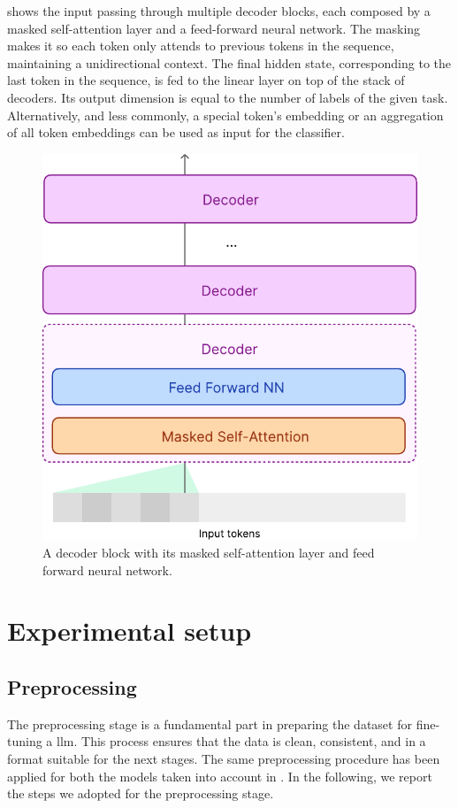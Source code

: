 \documentclass[11pt]{article}
\begin{document}
 shows the input passing through multiple decoder blocks, each composed by a masked 
self-attention layer and a feed-forward neural network. The masking makes it so each token only attends to previous tokens in the sequence, maintaining a unidirectional context. The final hidden state, corresponding to the last
token in the sequence, is fed to the linear layer on top of the stack of decoders. Its output dimension is equal to 
the number of labels of the given task.
%
Alternatively, and less commonly, a special token's embedding or an aggregation of all token embeddings can be
used as input for the classifier.

\begin{figure}
  \centering
  \includegraphics[width=0.8\linewidth]{figures/decoder-block.pdf}
  \caption{
    A decoder block with its masked self-attention layer and feed forward neural network.
  }
  \label{fig:decoder-block}
\end{figure}

\section{Experimental setup}\label{sec:experimental-setup}

\subsection{Preprocessing}\label{sec:preprocessing}
The preprocessing stage is a fundamental part in preparing the dataset for fine-tuning a \ac{llm}.
%
This process ensures that the data is clean, consistent, and in a format suitable for the next stages.
%
The same preprocessing procedure has been applied for both the models taken into account in .
%
In the following,
we report the steps we adopted for the preprocessing stage.
\end{document}
